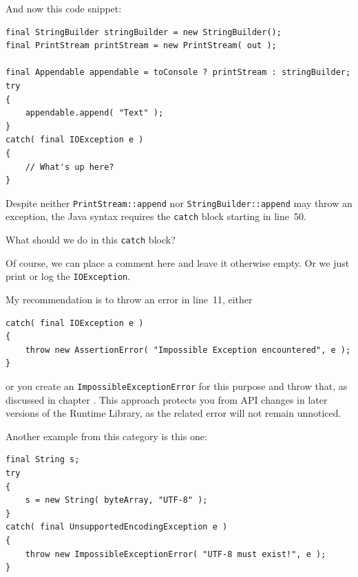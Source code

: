 And now this code snippet:
\begin{lstlisting}
final StringBuilder stringBuilder = new StringBuilder();
final PrintStream printStream = new PrintStream( out );

final Appendable appendable = toConsole ? printStream : stringBuilder;
try
{
    appendable.append( "Text" );
}
catch( final IOException e )
{
    // What's up here?
}
\end{lstlisting}

Despite neither \lstinline|PrintStream::append| nor \lstinline|StringBuilder::append| may throw an exception, the Java syntax requires the \lstinline|catch| block starting in line~50.

What should we do in this \lstinline|catch| block?

Of course, we can place a comment here and leave it otherwise empty. Or we just print or log the \lstinline|IOException|.

My recommendation is to throw an error in line~11, either
\begin{lstlisting}[firstnumber=9]
catch( final IOException e )
{
    throw new AssertionError( "Impossible Exception encountered", e );
}
\end{lstlisting}

or you create an \lstinline|ImpossibleExceptionError| for this purpose and throw that, as discussed in chapter . This approach protects you from API changes in later versions of the \Java Runtime Library, as the related error will not remain unnoticed.

Another example from this category is this one:
\begin{lstlisting}
final String s;
try
{
    s = new String( byteArray, "UTF-8" );
}
catch( final UnsupportedEncodingException e )
{
    throw new ImpossibleExceptionError( "UTF-8 must exist!", e );
}
\end{lstlisting}

